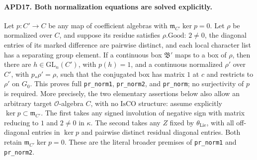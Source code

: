 \documentclass[11pt,a4paper]{article}
\numberwithin{equation}{section}
\theoremstyle{remark}\newtheorem{remark}[theorem]{Remark}
\begin{document}
\paragraph{APD17. Both normalization equations are solved explicitly.}
\label{claim:APD17}
Let \(p:C'\to C\) be any map of coefficient algebras with
\(\mathfrak m_{C'}\ker p=0\).  Let \(\rho\) be normalized
over \(C\), and suppose its residue satisfies
\(\rho.\mathrm{Good}\): \(2\ne0\), the diagonal entries
of its marked difference are pairwise distinct, and each local
character list has a separating group element.  If a continuous
box \(\mathfrak B'\) maps to a box of \(\rho\), then there
are \(h\in\mathrm{GL}_n(C')\), with \(p(h)=1\), and a
continuous normalized \(\rho'\) over \(C'\), with
\(p_*\rho'=\rho\), such that the conjugated box has matrix
\(1\) at \(c\) and restricts to \(\rho'\) on \(G_0\).
This proves full \texttt{pr\_\allowbreak norm1}, \texttt{pr\_\allowbreak norm2}, and
\texttt{pr\_\allowbreak norm}; no surjectivity of \(p\) is required.
More precisely, the two elementary assertions below also allow
an arbitrary target \(\mathcal O\)-algebra \(C\), with no
\(\mathrm{IsCO}\) structure: assume explicitly
\(\ker p\subset\mathfrak m_{C'}\).  The first takes any
signed involution of negative sign with matrix reducing to
\(1\) and \(2\ne0\) in \(\kappa\).  The second takes
any \(Z\) fixed by \(\theta_{\mathrm{Lie}}\), with all
off-diagonal entries in \(\ker p\) and pairwise distinct
residual diagonal entries.  Both retain
\(\mathfrak m_{C'}\ker p=0\).  These are the literal broader
premises of \texttt{pr\_\allowbreak norm1} and \texttt{pr\_\allowbreak norm2}.
\end{document}
